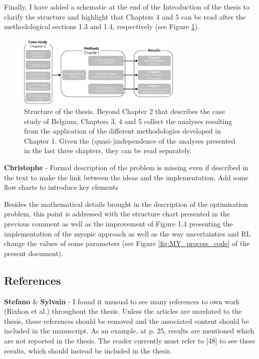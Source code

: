 \documentclass[12pt,a4paper]{article}
\begin{document}
\noindent Finally, I have added a schematic at the end of the Introduction of the thesis to clarify the structure and highlight that Chapters 4 and 5 can be read after the methodological sections 1.3 and 1.4, respectively (see Figure \ref{fig:intro:Thesis_Structure}).

\begin{figure}[htbp!]
\centering
\includegraphics[width=0.7\textwidth]{Thesis_Structure.pdf}
\caption{Structure of the thesis. Beyond Chapter 2 that describes the case study of Belgium, Chapters 3, 4 and 5 collect the analyses resulting from the application of the different methodologies developed in Chapter 1. Given the (quasi-)independence of the analyses presented in the last three chapters, they can be read separately.}
\label{fig:intro:Thesis_Structure}
\end{figure}


\begin{mdframed}[style=comment] %
{\color{violet} \textbf{Christophe}} - Formal description of the problem is missing even if described in the text to make the link between the ideas and the implementation. Add some flow charts to introduce key elements
\end{mdframed}

\noindent Besides the mathematical details brought in the description of the optimisation problem, this point is addressed with the structure chart presented in the previous comment as well as the improvement of Figure 1.4 presenting the implementation of the myopic approach as well as the way uncertainties and RL change the values of some parameters (see Figure \ref{fig:MY_process_code} of the present document).

\subsection{References}
\label{references}

\begin{mdframed}[style=comment] %
{\color{orange} \textbf{Stefano}} \& {\color{purple} \textbf{Sylvain}} - I found it unusual to see many references to own work (Rixhon et al.) throughout the thesis. Unless the articles are unrelated to the thesis, these references should be removed and the associated content should be included in the manuscript. As an example, at p. 25, results are mentioned which are not reported in the thesis. The reader currently must refer to [48] to see these results, which should instead be included in the thesis. 
\end{mdframed}
\end{document}
